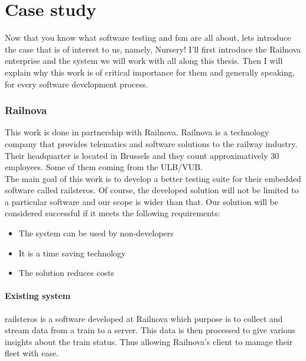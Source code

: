 \documentclass[12pt]{article}
\theoremstyle{definition}
\theoremstyle{definition}
\theoremstyle{remark}
\begin{document}
\clearpage
\part{Case study}

Now that you know what software testing and \gls{fsm} are all about, lets introduce the case that is of interest to us, namely, Nursery! I'll first introduce the Railnova enterprise and the system we will work with all along this thesis. Then I will explain why this work is of critical importance for them and generally speaking, for every software development process.

\clearpage



\section{Railnova}


This work is done in partnership with Railnova. Railnova is a technology company that provides telematics and software solutions to the railway industry. Their headquarter is located in Brussels and they count approximatively 30 employees. Some of them coming from the ULB/VUB.\\

The main goal of this work is to develop a better testing suite for their embedded software called \gls{railsteros}. Of course, the developed solution will not be limited to a particular software and our scope is wider than that. Our solution will be considered successful if it meets the following requirements:

\begin{itemize}
\item The system can be used by non-developers
\item It is a time saving technology
\item The solution reduces costs
\end{itemize}


\subsection{Existing system}

\gls{railsteros} is a software developed at Railnova which purpose is to collect and stream data from a train to a server. This data is then processed to give various insights about the train status. Thus allowing Railnova's client to manage their fleet with ease.\\
\end{document}
